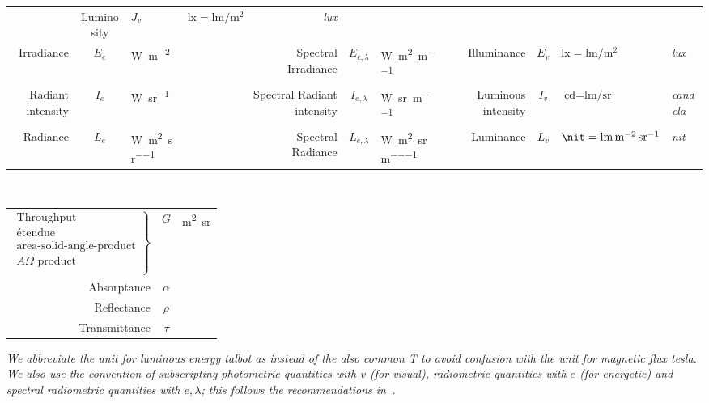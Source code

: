\begin{sidewaystable}
{\begin{tabular}{r c l l |@{$\;$} r c l l |@{$\;$} r c l l}
& Luminosity         & $J_v$           & $\unit{\lux} = \unit{\lumen\per\square\meter}$               & \textsl{lux} \\
%
  Irradiance          & $E_{e}$         & \unit{\watt\per\square\meter}                           &                  
& Spectral Irradiance & $E_{e,\lambda}$ & \unit{\watt\per\square\meter\per\meter}                 &                  
& Illuminance         & $E_v$           & $\unit{\lux} = \unit{\lumen\per\square\meter}$          & \textsl{lux}     \\
%
  Radiant intensity           & $I_{e}$         & \unit{\watt\per\steradian}                            &                  
& Spectral Radiant intensity  & $I_{e,\lambda}$ & \unit{\watt\per\steradian\per\meter}                  &                  
& Luminous intensity          & $I_v$           & $\unit{\candela} = \unit{\lumen\per\steradian}$       & \textsl{candela} \\
%
  Radiance           & $L_{e}$         & \unit{\watt\per\square\meter\per\steradian}                  &                  
& Spectral Radiance  & $L_{e,\lambda}$ & \unit{\watt\per\square\meter\per\steradian\per\meter}        &                  
& Luminance          & $L_v$           & $\unit{\nit} = \unit{\lumen\per\square\meter\per\steradian}$ & \textsl{nit}     \\
\end{tabular}\\[4mm]
\begin{tabular}{r @{\quad} c @{\quad} l}
$\left.
\begin{array}{r}
	\text{Throughput} \\ 
	\text{\'etendue} \\
	\text{area-solid-angle-product} \\
	A\Omega\text{ product} \\
\end{array}\right\}$    & $G$ & \unit{\square\meter\steradian} \\
Absorptance            & $\alpha$ & \\
Reflectance            & $\rho$ & \\
Transmittance          & $\tau$ & \\
\end{tabular}
\caption{Correspondence between radiometric and photometric units \label{tab:radiophoto}}

}
\vskip 1mm
{\footnotesize\it We abbreviate the unit for luminous energy \textit{talbot} as
\unit{\talbot} instead of the also common \unit{\tesla} to avoid confusion with the
unit for magnetic flux \textit{tesla}.
We also use the convention of subscripting photometric quantities
with $v$ (for \textit{visual}), radiometric quantities with $e$ (for
\textit{energetic}) and spectral radiometric quantities with $e,\lambda$;
this follows the recommendations in~\cite{iso:80000-7:2019,cie:s017.2020,iec:60050-845:2020}.}
\end{sidewaystable}


